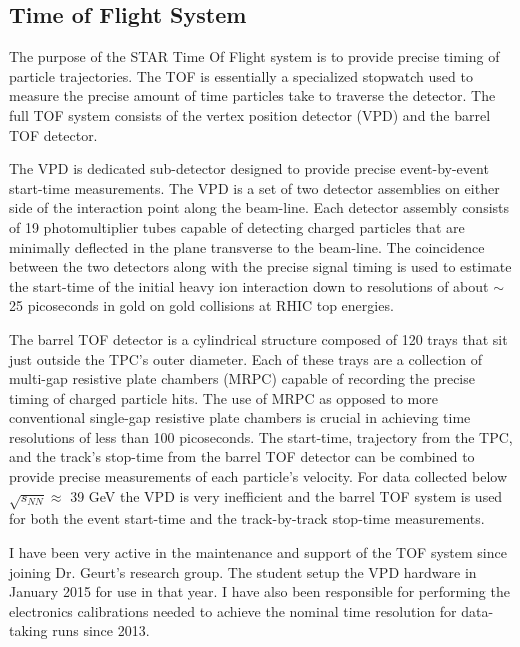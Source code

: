 	\subsection{ Time of Flight System }
		The purpose of the STAR Time Of Flight system is to provide precise timing of particle trajectories. The TOF is essentially a specialized stopwatch used to measure the precise amount of time particles take to traverse the detector. The full TOF system consists of the vertex position detector (VPD) and the barrel TOF detector.

		The VPD is dedicated sub-detector designed to provide precise event-by-event start-time measurements. The VPD is a set of two detector assemblies on either side of the interaction point along the beam-line. Each detector assembly consists of 19 photomultiplier tubes capable of detecting charged particles that are minimally deflected in the plane transverse to the beam-line. The coincidence between the two detectors along with the precise signal timing is used to estimate the start-time of the initial heavy ion interaction down to resolutions of about $\sim$25 picoseconds in gold on gold collisions at RHIC top energies\cite{llope_star_2014}.

		The barrel TOF detector is a cylindrical structure composed of 120 trays that sit just outside the TPC's outer diameter. Each of these trays are a collection of multi-gap resistive plate chambers (MRPC) capable of recording the precise timing of charged particle hits. The use of MRPC as opposed to more conventional single-gap resistive plate chambers is crucial in achieving time resolutions of less than 100 picoseconds. The start-time, trajectory from the TPC, and the track's stop-time from the barrel TOF detector can be combined to provide precise measurements of each particle's velocity. For data collected below $\sqrt{s_{NN}} \approx $ 39 GeV the VPD is very inefficient and the barrel TOF system is used for both the event start-time and the track-by-track stop-time measurements. 

		I have been very active in the maintenance and support of the TOF system since joining Dr. Geurt's research group. The student setup the VPD hardware in January 2015 for use in that year. I have also been responsible for performing the electronics calibrations needed to achieve the nominal time resolution for data-taking runs since 2013.